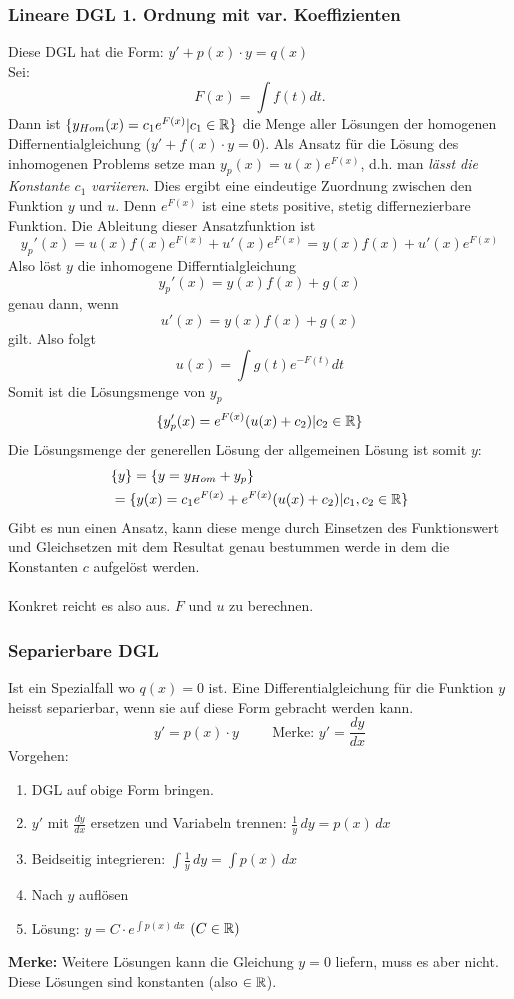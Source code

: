 \subsubsection{Lineare DGL 1. Ordnung mit var. Koeffizienten}
Diese DGL hat die Form: $y' + p(x) \cdot y = q(x)$\\
Sei:\[
F(x) = \int f(t) dt.
\]
Dann ist $\{y_{Hom}(x) = c_1e^{F(x)}| c_1 \in \mathbb{R}\}$ die Menge aller Lösungen der homogenen Differnentialgleichung ($y' + f(x) \cdot y = 0$). Als Ansatz für die Lösung des inhomogenen Problems setze man $y_p(x) = u(x)e^{F(x)}$, d.h. man \textit{lässt die Konstante $c_1$ variieren}. Dies ergibt eine eindeutige Zuordnung zwischen den Funktion $y$ und $u$. Denn $e^{F(x)}$ ist eine stets positive, stetig differnezierbare Funktion. Die Ableitung dieser Ansatzfunktion ist \[
y_p'(x) = u(x)f(x)e^{F(x)} + u'(x)e^{F(x)} = y(x)f(x) + u'(x)e^{F(x)}
\]
Also löst $y$ die inhomogene Differntialgleichung \[
y_p'(x) = y(x)f(x) + g(x)
\]
genau dann, wenn\[
u'(x) = y(x)f(x) + g(x)
\]
gilt. Also folgt\[
u(x) = \int  g(t)e^{-F(t)} dt
\]
Somit ist die Lösungsmenge von $y_p$
\[
\{ y_p'(x) = e^{F(x)} (u(x) + c_2) | c_2 \in \mathbb{R} \}
\]
Die Lösungsmenge der generellen Lösung der allgemeinen Lösung ist somit $y$:
\begin{align*}
&\{y\}=\{y = y_{Hom} + y_p\}\\
& =\{ y(x) =  c_1e^{F(x)} +  e^{F(x)} (u(x) + c_2) | c_1, c_2 \in \mathbb{R}\} 
\end{align*}
Gibt es nun einen Ansatz, kann diese menge durch Einsetzen des Funktionswert und Gleichsetzen mit dem Resultat genau bestummen werde in dem die Konstanten $c$  aufgelöst werden.\\
\\
Konkret reicht es also aus. $F$ und $u$ zu berechnen. 

\subsubsection{Separierbare DGL}
Ist ein Spezialfall wo $q(x) = 0$ ist.
Eine Differentialgleichung für die Funktion $y$ heisst separierbar, wenn sie auf diese Form gebracht werden kann.
\[
	y' = p(x) \cdot y \hspace{1cm} \text{Merke: $y' = \frac{dy}{dx}$}
\]
Vorgehen:
\begin{enumerate}
	\item DGL auf obige Form bringen.

	\item $y'$ mit $\frac{dy}{dx}$ ersetzen und Variabeln trennen: $\frac{1}{y} \, dy = p(x) \, dx$

	\item Beidseitig integrieren: $\int \frac{1}{y} \, dy = \int p(x) \, dx$

	\item Nach $y$ auflösen

	\item Lösung: $y = C \cdot e^{\int p(x) \, dx}$ \hspace{0.5cm} $(C \in \mathbb{R})$
\end{enumerate}
\textbf{Merke:} Weitere Lösungen kann die Gleichung $y = 0$ liefern, muss es aber nicht. Diese Lösungen sind konstanten (also $\in \mathbb{R}$).


